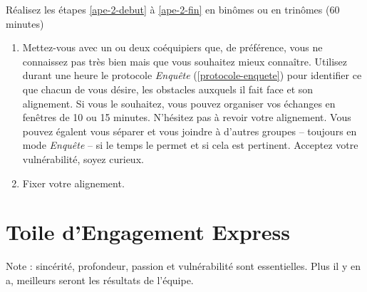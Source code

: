 \documentclass[paper=6in:9in,pagesize=pdftex,headinclude=on,footinclude=on,12pt]{scrbook}
\newcommand*{\numref}[1]{{\hyperref[{#1}]{\autoref*{#1}}}}
\begin{document}
Réalisez les étapes \ref{ape-2-debut} à \ref{ape-2-fin} en binômes ou en trinômes (60 minutes)

\begin{enumerate}[resume]
	\item \label{ape-2-debut} Mettez-vous avec un ou deux coéquipiers que, de préférence, vous ne connaissez pas très bien mais que vous souhaitez mieux
	      connaître. Utilisez durant une heure le protocole \emph{Enquête} (\numref{protocole-enquete}) pour identifier ce que chacun de vous désire,
	      les obstacles auxquels il fait face et son alignement. Si vous le souhaitez, vous pouvez organiser vos échanges en fenêtres de 10 ou 15 minutes.
	      N'hésitez pas à revoir votre alignement. Vous pouvez égalent vous séparer et vous joindre à d'autres groupes -- toujours en mode
	      \emph{Enquête} -- si le temps le permet et si cela est pertinent. Acceptez votre vulnérabilité, soyez curieux.
	\item \label{ape-2-fin} Fixer votre alignement.
\end{enumerate}

\section{Toile d'Engagement Express} \label{toile-engagement-express}

Note : sincérité, profondeur, passion et vulnérabilité sont essentielles. Plus il y en a, meilleurs seront les résultats de l'équipe.
\end{document}
